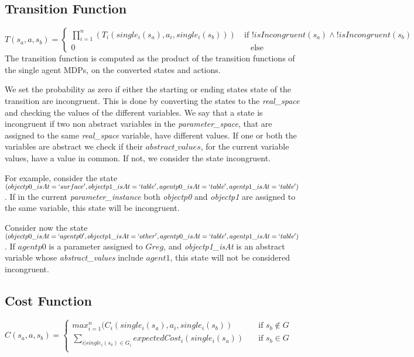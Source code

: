 \subsection{Transition Function}
$T(s_a,a,s_b)=
\begin{cases}
\prod_{i=1}^{n}(T_i(single_i(s_a),a_i,single_i(s_b))) & \> \text{if } !isIncongruent(s_a) \land  !isIncongruent(s_b)  \\
0   & \quad \text{else}
	\end{cases}$ \\

The transition function is computed as the product of the transition functions of the single agent MDPs, on the converted states and actions.

We set the probability as zero if either the starting or ending states state of the transition are incongruent. This is done by converting the states to the \textit{real\_space} and checking the values of the different variables. We say that a state is incongruent if two non abstract variables in the \textit{parameter\_space}, that are assigned to the same \textit{real\_space} variable, have different values. If one or both the variables are abstract we check if their $abstract\_values$, for the current variable values, have a value in common. If not, we consider the state incongruent.

For example, consider the state $(objectp0\_isAt=`surface', objectp1\_isAt=`table', agentp0\_isAt=`table', agentp1\_isAt=`table')$. If in the current \textit{parameter\_instance} both \textit{objectp0} and \textit{objectp1} are assigned to the same variable, this state will be incongruent.

Consider now the state $(objectp0\_isAt=`agentp0', objectp1\_isAt=`other', agentp0\_isAt=`table', \\ agentp1\_isAt=`table')$. If $agentp0$ is a parameter assigned to $Greg$, and \textit{objectp1\_isAt} is an abstract variable whose \textit{abstract\_values} include $agent1$, this state will not be considered incongruent.  

\subsection{Cost Function}
$C(s_a,a,s_b)= 
	\begin{cases}
		max_{i=1}^{n}(C_i(single_i(s_a),a_i,single_i(s_b))  & \quad \text{if } s_b \not\in G \\
		\sum_{i | single_i(s_a) \in G_i} expectedCost_i(single_i(s_a))  & \quad \text{if } s_b \in  G
		\\
	\end{cases} $	\\

